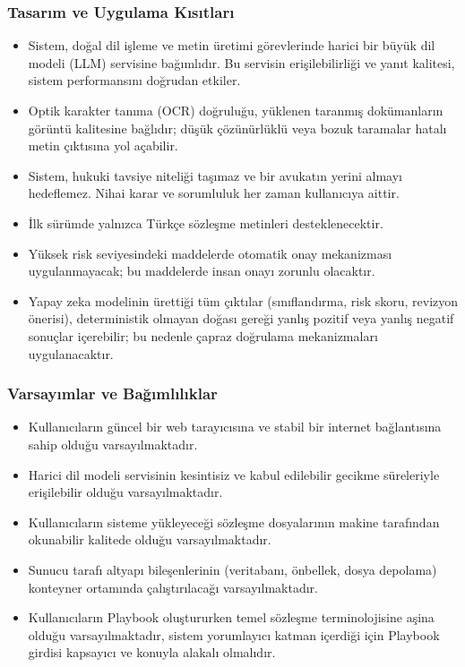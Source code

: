 \documentclass[12pt, a4paper]{article}
\begin{document}
\subsubsection{Tasarım ve Uygulama Kısıtları}
\begin{itemize}[leftmargin=2cm]
    \item Sistem, doğal dil işleme ve metin üretimi görevlerinde harici bir büyük dil modeli (LLM) servisine bağımlıdır. Bu servisin erişilebilirliği ve yanıt kalitesi, sistem performansını doğrudan etkiler.
    \item Optik karakter tanıma (OCR) doğruluğu, yüklenen taranmış dokümanların görüntü kalitesine bağlıdır; düşük çözünürlüklü veya bozuk taramalar hatalı metin çıktısına yol açabilir.
    \item Sistem, hukuki tavsiye niteliği taşımaz ve bir avukatın yerini almayı hedeflemez. Nihai karar ve sorumluluk her zaman kullanıcıya aittir.
    \item İlk sürümde yalnızca Türkçe sözleşme metinleri desteklenecektir.
    \item Yüksek risk seviyesindeki maddelerde otomatik onay mekanizması uygulanmayacak; bu maddelerde insan onayı zorunlu olacaktır.
    \item Yapay zeka modelinin ürettiği tüm çıktılar (sınıflandırma, risk skoru, revizyon önerisi), deterministik olmayan doğası gereği yanlış pozitif veya yanlış negatif sonuçlar içerebilir; bu nedenle çapraz doğrulama mekanizmaları uygulanacaktır.
\end{itemize}

\subsubsection{Varsayımlar ve Bağımlılıklar}
\begin{itemize}[leftmargin=2cm]
    \item Kullanıcıların güncel bir web tarayıcısına ve stabil bir internet bağlantısına sahip olduğu varsayılmaktadır.
    \item Harici dil modeli servisinin kesintisiz ve kabul edilebilir gecikme süreleriyle erişilebilir olduğu varsayılmaktadır.
    \item Kullanıcıların sisteme yükleyeceği sözleşme dosyalarının makine tarafından okunabilir kalitede olduğu varsayılmaktadır.
    \item Sunucu tarafı altyapı bileşenlerinin (veritabanı, önbellek, dosya depolama) konteyner ortamında çalıştırılacağı varsayılmaktadır.
    \item Kullanıcıların Playbook oluştururken temel sözleşme terminolojisine aşina olduğu varsayılmaktadır, sistem yorumlayıcı katman içerdiği için Playbook girdisi kapsayıcı ve konuyla alakalı olmalıdır.
\end{itemize}
\end{document}
